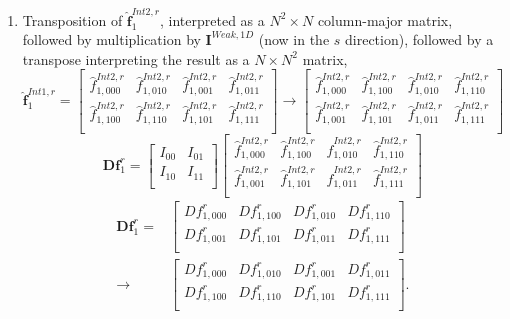 \documentclass[12pt,Bold,letterpaper,TexShade]{mcgilletdclass}
\numberwithin{equation}{section}
\begin{document}
\begin{enumerate}
\item Transposition of $\hat{\boldsymbol f}^{Int2,r}_{1}$, interpreted as a $N^2 \times N$ column-major matrix, followed by multiplication by $\boldsymbol I^{Weak,1D}$ (now in the $s$ direction), followed by a transpose interpreting the result as a $N \times N^2$ matrix,
\begin{equation} \nonumber
\hat{\boldsymbol f}^{Int1,r}_{1}
=
\begin{bmatrix}
\hat{f}^{Int2,r}_{1,000} & \hat{f}^{Int2,r}_{1,010} & \hat{f}^{Int2,r}_{1,001} & \hat{f}^{Int2,r}_{1,011} \\
\hat{f}^{Int2,r}_{1,100} & \hat{f}^{Int2,r}_{1,110} & \hat{f}^{Int2,r}_{1,101} & \hat{f}^{Int2,r}_{1,111} \\
\end{bmatrix}
\rightarrow
\begin{bmatrix}
\hat{f}^{Int2,r}_{1,000} & \hat{f}^{Int2,r}_{1,100} & \hat{f}^{Int2,r}_{1,010} & \hat{f}^{Int2,r}_{1,110} \\
\hat{f}^{Int2,r}_{1,001} & \hat{f}^{Int2,r}_{1,101} & \hat{f}^{Int2,r}_{1,011} & \hat{f}^{Int2,r}_{1,111} \\
\end{bmatrix}
\end{equation}
\begin{equation} \nonumber
\boldsymbol {Df}^{r}_{1}
=
\begin{bmatrix}
I_{00} & I_{01} \\
I_{10} & I_{11} \\
\end{bmatrix}
\begin{bmatrix}
\hat{f}^{Int2,r}_{1,000} & \hat{f}^{Int2,r}_{1,100} & \hat{f}^{Int2,r}_{1,010} & \hat{f}^{Int2,r}_{1,110} \\
\hat{f}^{Int2,r}_{1,001} & \hat{f}^{Int2,r}_{1,101} & \hat{f}^{Int2,r}_{1,011} & \hat{f}^{Int2,r}_{1,111} \\
\end{bmatrix}
\end{equation}
\begin{equation} \nonumber
\begin{split}
\boldsymbol {Df}^{r}_{1}
= &
\begin{bmatrix}
{Df}^{r}_{1,000} & {Df}^{r}_{1,100} & {Df}^{r}_{1,010} & {Df}^{r}_{1,110} \\
{Df}^{r}_{1,001} & {Df}^{r}_{1,101} & {Df}^{r}_{1,011} & {Df}^{r}_{1,111} \\
\end{bmatrix} \\
\rightarrow &
\begin{bmatrix}
{Df}^{r}_{1,000} & {Df}^{r}_{1,010} & {Df}^{r}_{1,001} & {Df}^{r}_{1,011} \\
{Df}^{r}_{1,100} & {Df}^{r}_{1,110} & {Df}^{r}_{1,101} & {Df}^{r}_{1,111} \\
\end{bmatrix}.
\end{split}
\end{equation}
\end{enumerate}
\end{document}
